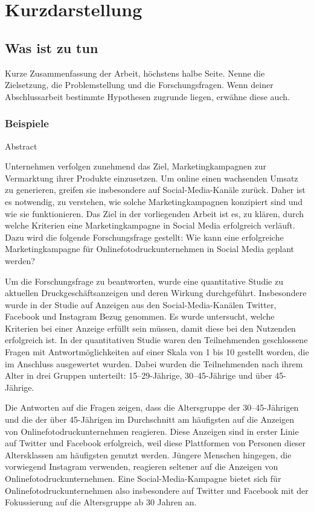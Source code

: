 
\thispagestyle{empty}
\section*{Kurzdarstellung}
\label{sec:kurzdarstellung}

\subsection{Was ist zu tun}
Kurze Zusammenfassung der Arbeit, höchstens halbe Seite.
Nenne die Zielsetzung, die Problemstellung und die Forschungsfragen. Wenn deiner Abschlussarbeit bestimmte Hypothesen zugrunde liegen, erwähne diese auch.

\subsubsection*{Beispiele}
Abstract

Unternehmen verfolgen zunehmend das Ziel, Marketingkampagnen zur Vermarktung ihrer Produkte einzusetzen. 
Um online einen wachsenden Umsatz zu generieren, greifen sie insbesondere auf Social-Media-Kanäle zurück. 
Daher ist es notwendig, zu verstehen, wie solche Marketingkampagnen konzipiert sind und wie sie funktionieren.
Das Ziel in der vorliegenden Arbeit ist es, zu klären, durch welche Kriterien eine Marketingkampagne in Social Media erfolgreich verläuft. Dazu wird die folgende Forschungsfrage gestellt: Wie kann eine erfolgreiche Marketingkampagne für Onlinefotodruckunternehmen in Social Media geplant werden?

Um die Forschungsfrage zu beantworten, wurde eine quantitative Studie zu aktuellen Druckgeschäftsanzeigen und deren Wirkung durchgeführt. Insbesondere wurde in der Studie auf Anzeigen aus den Social-Media-Kanälen Twitter, Facebook und Instagram Bezug genommen. Es wurde untersucht, welche Kriterien bei einer Anzeige erfüllt sein müssen, damit diese bei den Nutzenden erfolgreich ist. In der quantitativen Studie waren den Teilnehmenden geschlossene Fragen mit Antwortmöglichkeiten auf einer Skala von 1 bis 10 gestellt worden, die im Anschluss ausgewertet wurden. Dabei wurden die Teilnehmenden nach ihrem Alter in drei Gruppen unterteilt: 15–29-Jährige, 30–45-Jährige und über 45-Jährige.

Die Antworten auf die Fragen zeigen, dass die Altersgruppe der 30–45-Jährigen und die der über 45-Jährigen im Durchschnitt am häufigsten auf die Anzeigen von Onlinefotodruckunternehmen reagieren. Diese Anzeigen sind in erster Linie auf Twitter und Facebook erfolgreich, weil diese Plattformen von Personen dieser Altersklassen am häufigsten genutzt werden. Jüngere Menschen hingegen, die vorwiegend Instagram verwenden, reagieren seltener auf die Anzeigen von Onlinefotodruckunternehmen. Eine Social-Media-Kampagne bietet sich für Onlinefotodruckunternehmen also insbesondere auf Twitter und Facebook mit der Fokussierung auf die Altersgruppe ab 30 Jahren an.

